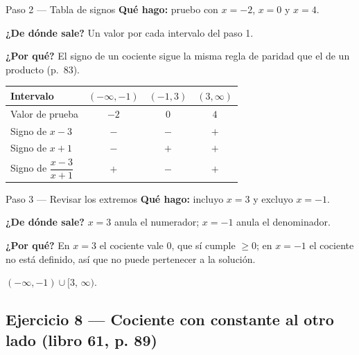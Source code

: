 \documentclass[11pt]{article}
\begin{document}
\begin{paso}{Paso 2 --- Tabla de signos}
\textbf{Qué hago:} pruebo con $x=-2$, $x=0$ y $x=4$.

\textbf{¿De dónde sale?} Un valor por cada intervalo del paso 1.

\textbf{¿Por qué?} El signo de un cociente sigue la misma regla de paridad que el de un producto (p.~83).

\begin{center}
\begin{tabular}{|l|c|c|c|}
\hline
Intervalo & $(-\infty,-1)$ & $(-1,3)$ & $(3,\infty)$ \\
\hline
Valor de prueba & $-2$ & $0$ & $4$ \\
Signo de $x-3$ & $-$ & $-$ & $+$ \\
Signo de $x+1$ & $-$ & $+$ & $+$ \\
\hline
Signo de $\dfrac{x-3}{x+1}$ & $+$ & $-$ & $+$ \\
\hline
\end{tabular}
\end{center}
\end{paso}

\begin{paso}{Paso 3 --- Revisar los extremos}
\textbf{Qué hago:} incluyo $x=3$ y excluyo $x=-1$.

\textbf{¿De dónde sale?} $x=3$ anula el numerador; $x=-1$ anula el denominador.

\textbf{¿Por qué?} En $x=3$ el cociente vale $0$, que sí cumple $\ge 0$; en $x=-1$ el cociente no está definido, así que no puede pertenecer a la solución.
\end{paso}

\begin{center}
\end{center}

\begin{resp}
$(-\infty,-1)\cup[3,\,\infty)$.
\end{resp}

\subsection*{Ejercicio 8 --- Cociente con constante al otro lado (libro 61, p. 89)}
\end{document}
